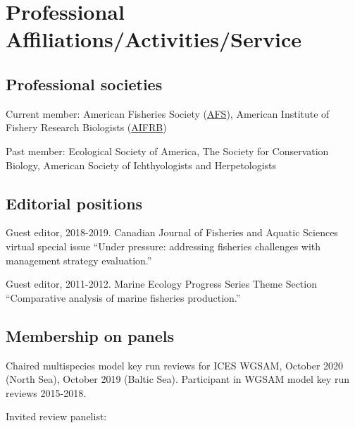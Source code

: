 \documentclass[11pt, a4paper]{awesome-cv}
\begin{document}
\hypertarget{professional-affiliationsactivitiesservice}{%
\section{Professional
Affiliations/Activities/Service}\label{professional-affiliationsactivitiesservice}}

\hypertarget{professional-societies}{%
\subsection{Professional societies}\label{professional-societies}}

Current member: American Fisheries Society
(\href{https://fisheries.org/}{AFS}), American Institute of Fishery
Research Biologists (\href{https://www.aifrb.org/}{AIFRB})

Past member: Ecological Society of America, The Society for Conservation
Biology, American Society of Ichthyologists and Herpetologists

\hypertarget{editorial-positions}{%
\subsection{Editorial positions}\label{editorial-positions}}

Guest editor, 2018-2019. Canadian Journal of Fisheries and Aquatic
Sciences virtual special issue ``Under pressure: addressing fisheries
challenges with management strategy evaluation.''

Guest editor, 2011-2012. Marine Ecology Progress Series Theme Section
``Comparative analysis of marine fisheries production.''

\hypertarget{membership-on-panels}{%
\subsection{Membership on panels}\label{membership-on-panels}}

Chaired multispecies model key run reviews for ICES WGSAM, October 2020
(North Sea), October 2019 (Baltic Sea). Participant in WGSAM model key
run reviews 2015-2018.

Invited review panelist:
\end{document}
